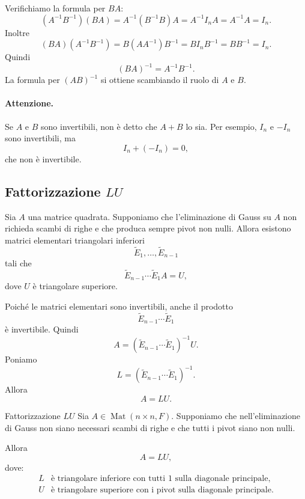 \documentclass[a4paper]{article}
\begin{document}
\begin{snippetproof}{}
    Verifichiamo la formula per \(BA\):
    \[
        (A^{-1}B^{-1})(BA)
        =
        A^{-1}(B^{-1}B)A
        =
        A^{-1}I_nA
        =
        A^{-1}A
        =
        I_n.
    \]
    Inoltre
    \[
        (BA)(A^{-1}B^{-1})
        =
        B(AA^{-1})B^{-1}
        =
        BI_nB^{-1}
        =
        BB^{-1}
        =
        I_n.
    \]
    Quindi
    \[
        (BA)^{-1}=A^{-1}B^{-1}.
    \]
    La formula per \((AB)^{-1}\) si ottiene scambiando il ruolo di \(A\) e \(B\).
\end{snippetproof}

\paragraph{Attenzione.}
Se \(A\) e \(B\) sono invertibili, non è detto che \(A+B\) lo sia. Per esempio, \(I_n\) e \(-I_n\) sono invertibili, ma
\[
    I_n+(-I_n)=0,
\]
che non è invertibile.

\subsection{Fattorizzazione \(LU\)}

Sia \(A\) una matrice quadrata. Supponiamo che l'eliminazione di Gauss su \(A\) non richieda scambi di righe e che produca sempre pivot non nulli. Allora esistono matrici elementari triangolari inferiori
\[
    \widetilde{E}_1,\ldots,\widetilde{E}_{n-1}
\]
tali che
\[
    \widetilde{E}_{n-1}\cdots\widetilde{E}_1A=U,
\]
dove \(U\) è triangolare superiore.

Poiché le matrici elementari sono invertibili, anche il prodotto
\[
    \widetilde{E}_{n-1}\cdots\widetilde{E}_1
\]
è invertibile. Quindi
\[
    A=
    (\widetilde{E}_{n-1}\cdots\widetilde{E}_1)^{-1}U.
\]
Poniamo
\[
    L=(\widetilde{E}_{n-1}\cdots\widetilde{E}_1)^{-1}.
\]
Allora
\[
    A=LU.
\]

\begin{snippettheorem}{Fattorizzazione \(LU\)}
    Sia \(A\in\operatorname{Mat}(n\times n,F)\). Supponiamo che nell'eliminazione di Gauss non siano necessari scambi di righe e che tutti i pivot siano non nulli.

    Allora
    \[
        A=LU,
    \]
    dove:
    \[
        \begin{array}{ll}
            L & \text{è triangolare inferiore con tutti \(1\) sulla diagonale principale},\\
            U & \text{è triangolare superiore con i pivot sulla diagonale principale}.
        \end{array}
    \]
\end{snippettheorem}
\end{document}
